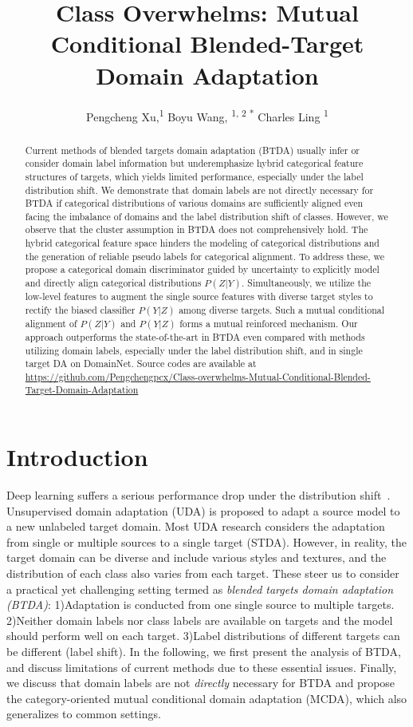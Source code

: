 \documentclass[letterpaper]{article} \usepackage{aaai23}  \usepackage{times}  \usepackage{helvet}  \usepackage{courier}  \usepackage[hyphens]{url}  \usepackage{graphicx} \urlstyle{rm} \def\UrlFont{\rm}  \usepackage{natbib}  \usepackage{caption} \frenchspacing  \setlength{\pdfpagewidth}{8.5in}  \setlength{\pdfpageheight}{11in}
\title{Class Overwhelms: Mutual Conditional Blended-Target Domain Adaptation}
\author{
    Pengcheng Xu,\textsuperscript{\rm 1}
    Boyu Wang, \textsuperscript{\rm 1, \rm 2 *}
    Charles Ling \textsuperscript{\rm 1}
}
\begin{document}
\maketitle

\begin{abstract}
Current methods of blended targets domain adaptation (BTDA) usually infer or consider domain label information but underemphasize hybrid categorical feature structures of targets, which yields limited performance, especially under the label distribution shift.
We demonstrate that domain labels are not directly necessary for BTDA if categorical distributions of various domains are sufficiently aligned even facing the imbalance of domains and the label distribution shift of classes.
However, we observe that the cluster assumption in BTDA does not comprehensively hold. The hybrid categorical feature space hinders the modeling of categorical distributions and the generation of reliable pseudo labels for categorical alignment.
To address these, we propose a categorical domain discriminator guided by uncertainty to explicitly model and directly align categorical distributions $P(Z|Y)$. Simultaneously, we utilize the low-level features to augment the single source features with diverse target styles to rectify the biased classifier $P(Y|Z)$ among diverse targets. Such a mutual conditional alignment of $P(Z|Y)$ and $P(Y|Z)$ forms a mutual reinforced mechanism.
Our approach outperforms the state-of-the-art in BTDA even compared with methods utilizing domain labels, especially under the label distribution shift, and in single target DA on DomainNet. Source codes are available at \url{https://github.com/Pengchengpcx/Class-overwhelms-Mutual-Conditional-Blended-Target-Domain-Adaptation}
\end{abstract}



\section{Introduction}
Deep learning suffers a serious performance drop under the distribution shift~\cite{ben2006analysis}. Unsupervised domain adaptation (UDA) is proposed to adapt a source model to a new unlabeled target domain. Most UDA research considers the adaptation from single or multiple sources to a single target (STDA). However, in reality, the target domain can be diverse and include various styles and textures, and the distribution of each class also varies from each target. These steer us to consider a practical yet challenging setting termed as \textit{blended targets domain adaptation (BTDA)}: 1)Adaptation is conducted from one single source to multiple targets. 2)Neither domain labels nor class labels are available on targets and the model should perform well on each target. 3)Label distributions of different targets can be different (label shift). In the following, we first present the analysis of BTDA, and discuss limitations of current methods due to these essential issues. Finally, we discuss that domain labels are not \textit{directly} necessary for BTDA and propose the category-oriented mutual conditional domain adaptation (MCDA), which also generalizes to common settings.
\end{document}
